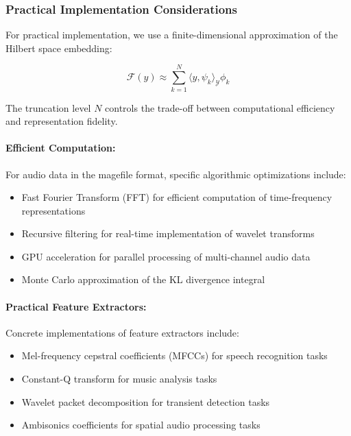 \subsubsection{Practical Implementation Considerations}

For practical implementation, we use a finite-dimensional approximation of the Hilbert space embedding:

\begin{equation}
\mathcal{F}(y) \approx \sum_{k=1}^{N} \langle y, \psi_k \rangle_{\mathcal{Y}} \phi_k
\end{equation}

The truncation level $N$ controls the trade-off between computational efficiency and representation fidelity.

\paragraph{Efficient Computation:}
For audio data in the magefile format, specific algorithmic optimizations include:

\begin{itemize}
\item Fast Fourier Transform (FFT) for efficient computation of time-frequency representations
\item Recursive filtering for real-time implementation of wavelet transforms
\item GPU acceleration for parallel processing of multi-channel audio data
\item Monte Carlo approximation of the KL divergence integral
\end{itemize}

\paragraph{Practical Feature Extractors:}
Concrete implementations of feature extractors include:
\begin{itemize}
\item Mel-frequency cepstral coefficients (MFCCs) for speech recognition tasks
\item Constant-Q transform for music analysis tasks
\item Wavelet packet decomposition for transient detection tasks
\item Ambisonics coefficients for spatial audio processing tasks
\end{itemize}

